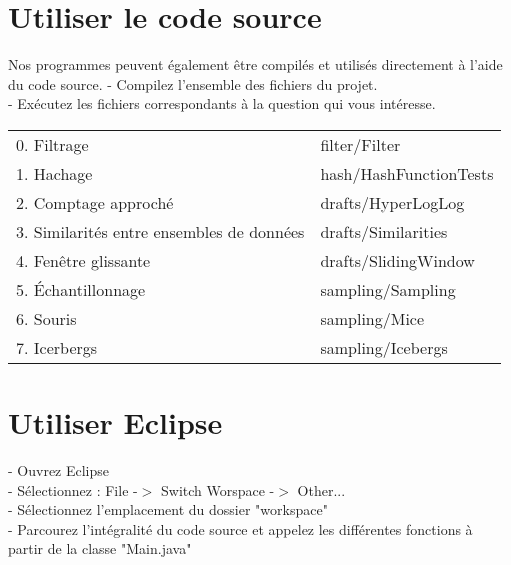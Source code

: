 \documentclass[12pt,a4paper,titlepage]{article}
\begin{document}
\section{Utiliser le code source}
Nos programmes peuvent également être compilés et utilisés directement à l'aide du code source.
- Compilez l'ensemble des fichiers du projet.\\
- Exécutez les fichiers correspondants à la question qui vous intéresse.
\begin{center} \begin{tabular}{ll}
0. Filtrage 		 & filter/Filter \\
1. Hachage 			 & hash/HashFunctionTests \\
2. Comptage approché & drafts/HyperLogLog \\
3. Similarités entre ensembles de données & drafts/Similarities \\
4. Fenêtre glissante & drafts/SlidingWindow \\
5. Échantillonnage 	 & sampling/Sampling \\
6. Souris 			 & sampling/Mice \\
7. Icerbergs 		 & sampling/Icebergs
\end{tabular} \end{center}

\section{Utiliser Eclipse}
- Ouvrez Eclipse\\
- Sélectionnez : File -$>$ Switch Worspace -$>$ Other...\\
- Sélectionnez l'emplacement du dossier "workspace"\\
- Parcourez l'intégralité du code source et appelez les différentes fonctions à partir de la classe "Main.java"
\end{document}
